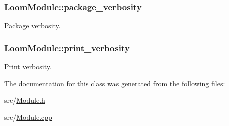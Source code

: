 \subsubsection[{\texorpdfstring{package\+\_\+verbosity}{package_verbosity}}]{ Loom\+Module\+::package\+\_\+verbosity\hspace{0.3cm}{\ttfamily [protected]}}\hypertarget{class_loom_module_aec8db10ee69e265779822792f177f982}{}\label{class_loom_module_aec8db10ee69e265779822792f177f982}


Package verbosity. 

\subsubsection[{\texorpdfstring{print\+\_\+verbosity}{print_verbosity}}]{ Loom\+Module\+::print\+\_\+verbosity\hspace{0.3cm}{\ttfamily [protected]}}\hypertarget{class_loom_module_a6e73663a6a5ebdcbe3f92153ca88ce8c}{}\label{class_loom_module_a6e73663a6a5ebdcbe3f92153ca88ce8c}


Print verbosity. 



The documentation for this class was generated from the following files\+:\begin{DoxyCompactItemize}
\item 
src/\hyperlink{_module_8h}{Module.\+h}\item 
src/\hyperlink{_module_8cpp}{Module.\+cpp}\end{DoxyCompactItemize}
